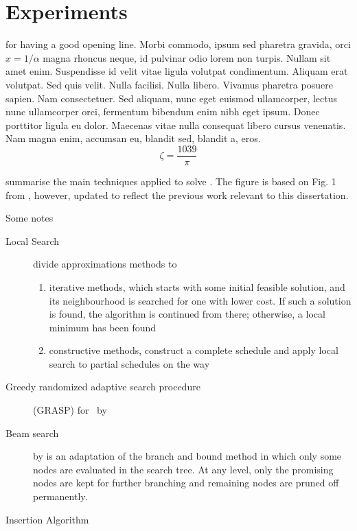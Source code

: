 

\chapter{Experiments }\label{ch:experiments} 

 for having a good opening line. Morbi commodo, ipsum sed pharetra gravida, orci  $x = 1/\alpha$ magna rhoncus neque, id pulvinar odio lorem non turpis. Nullam sit amet enim. Suspendisse id velit vitae ligula volutpat condimentum. Aliquam erat volutpat. Sed quis velit. Nulla facilisi. Nulla libero. Vivamus pharetra posuere sapien. Nam consectetuer. Sed aliquam, nunc eget euismod ullamcorper, lectus nunc ullamcorper orci, fermentum bibendum enim nibh eget ipsum. Donec porttitor ligula eu dolor. Maecenas vitae nulla consequat libero cursus venenatis. Nam magna enim, accumsan eu, blandit sed, blandit a, eros.
$$\zeta = \frac{1039}{\pi}$$

\clearpage

 summarise the main techniques applied to solve \JSP. The 
figure is based on Fig. 1 from \citet{Jain99}, however, updated to reflect the 
previous work relevant to this dissertation.

Some notes
\begin{description}
    \item[Local Search] \cite{LocalSearch} divide approximations methods to 
    \begin{enumerate}
        \item iterative methods, which starts with some initial feasible 
        solution, and its neighbourhood is searched for one with lower cost. If 
        such a solution is found, the algorithm is
        continued from there; otherwise, a local minimum has been found
        \item constructive methods, construct a complete schedule and apply 
        local search to partial schedules on the way
    \end{enumerate}
    \item[Greedy randomized adaptive search procedure] (GRASP) for \JSP\ by 
    \cite{GRASP}
    \item[Beam search] by \cite{BeamSearch} is an adaptation of the branch and 
    bound method in which only some nodes are evaluated in the search tree. At 
    any level, only the promising nodes are kept for further branching and 
    remaining nodes are pruned off permanently.
    \item[Insertion Algorithm] \cite{InsertionAlg} 
\end{description}


\clearpage
